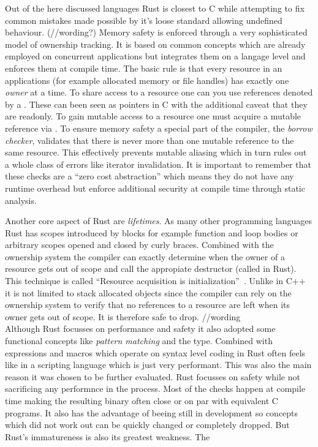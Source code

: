 Out of the here discussed languages Rust is closest to C while attempting to fix common mistakes made possible by it's loose standard allowing undefined behaviour. (//wording?) Memory safety is enforced through a very sophisticated model of ownership tracking. It is based on common concepts which are already employed on concurrent applications but integrates them on a langage level and enforces them at compile time. The basic rule is that every resource in an applications (for example allocated memory or file handles) has exactly one \textit{owner} at a time. To share access to a resource one can you use references denoted by a \mdinline{\&}. These can been seen as pointers in C with the additional caveat that they are readonly. To gain mutable access to a resource one must acquire a mutable reference via . To ensure memory safety a special part of the compiler, the \textit{borrow checker}, validates that there is never more than one mutable reference to the same resource. This effectively prevents mutable aliasing which in turn rules out a whole class of errors like iterator invalidation. It is important to remember that these checks are a ``zero cost abstraction'' which means they do not have any runtime overhead but enforce additional security at compile time through static analysis.

Another core aspect of Rust are \textit{lifetimes}. As many other programming languages Rust has scopes introduced by blocks for example function and loop bodies or arbitrary scopes opened and closed by curly braces. Combined with the ownership system the compiler can exactly determine when the owner of a resource gets out of scope and call the appropiate destructor (called  in Rust). This technique is called ``Resource acquisition is initialization''~\cite[p. 389]{evolution_c++}. Unlike in C++ it is not limited to stack allocated objects since the compiler can rely on the ownership system to verify that no references to a resource are left when its owner gets out of scope. It is therefore safe to drop. //wording
\\


Although Rust focusses on performance and safety it also adopted some functional concepts like \textit{pattern matching} and the  type. Combined with  expressions and macros which operate on syntax level coding in Rust often feels like in a scripting language which is just very performant. This was also the main reason it was chosen to be further evaluated. Rust focusses on safety while not sacrificing any performnce in the process. Most of the checks happen at compile time making the resulting binary often close or on par with equivalent C programs. It also has the advantage of beeing still in development so concepts which did not work out can be quickly changed or completely dropped.
But Rust's immatureness is also its greatest weakness. The


